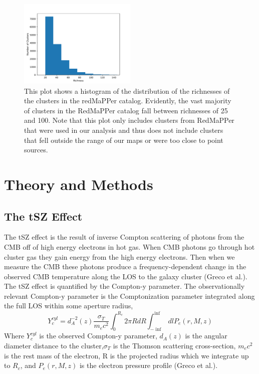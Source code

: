 \documentclass{princeton_astro_thesis}
\begin{document}
\begin{figure}[h]
\centering
\includegraphics[width=0.5\textwidth]{../redmapper_richness_hist.pdf}
\caption{This plot shows a histogram of the distribution of the richnesses of the clusters in the redMaPPer catalog. Evidently, the vast majority of clusters in the RedMaPPer catalog fall between richnesses of 25 and 100. Note that this plot only includes clusters from RedMaPPer that were used in our analysis and thus does not include clusters that fell outside the range of our maps or were too close to point sources. }
\end{figure}

 \chapter{Theory and Methods}
\section{The tSZ Effect}
The tSZ effect is the result of inverse Compton scattering of photons from the CMB off of high energy electrons in hot gas. When CMB photons go through hot cluster gas they gain energy from the high energy electrons. Then when we measure the CMB these photons produce a frequency-dependent change in the observed CMB temperature along the LOS to the galaxy cluster (Greco et al.). The tSZ effect is quantified by the Compton-y parameter. The observationally relevant Compton-y parameter is the Comptonization parameter integrated along the full LOS within some aperture radius,
\begin{equation}
Y^{cyl}_{c}=d^{-2}_A(z) \frac{\sigma_T}{m_e c^2}\int_0^{R_c} 2 \pi R dR \int_{-\inf}^{\inf} dl P_e(r,M,z)
\end{equation}
Where $Y^{cyl}_{c}$ is the observed Compton-y parameter, $d_A(z)$ is the angular diameter distance to the cluster,$\sigma_T$ is the Thomson scattering cross-section, $m_e c^2$ is the rest mass of the electron, R is the  projected radius which we integrate up to $R_c$,  and $P_e(r,M,z)$ is the electron pressure profile (Greco et al.).
\end{document}
